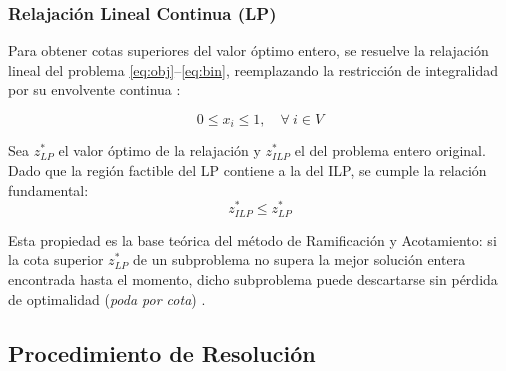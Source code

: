 \subsubsection{Relajación Lineal Continua (LP)}

Para obtener cotas superiores del valor óptimo entero, se resuelve la relajación lineal del problema \eqref{eq:obj}--\eqref{eq:bin}, reemplazando la restricción de integralidad por su envolvente continua \parencite{nemhauser1988, schrijver1986}:

\begin{equation}\label{eq:relax}
    0 \leq x_i \leq 1, \quad \forall\ i \in V
\end{equation}

Sea $z^*_{LP}$ el valor óptimo de la relajación y $z^*_{ILP}$ el del problema entero original. Dado que la región factible del LP contiene a la del ILP, se cumple la relación fundamental:
\begin{equation}\label{eq:cota}
    z^*_{ILP} \leq z^*_{LP}
\end{equation}

Esta propiedad es la base teórica del método de Ramificación y Acotamiento: si la cota superior $z^*_{LP}$ de un subproblema no supera la mejor solución entera encontrada hasta el momento, dicho subproblema puede descartarse sin pérdida de optimalidad (\textit{poda por cota}) \parencite{nemhauser1988, wolsey1998}.

\subsection{Procedimiento de Resolución}

